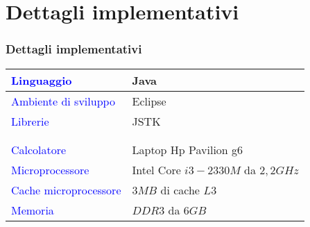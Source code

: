 \section{Dettagli implementativi}
\begin{frame}
  \frametitle{Dettagli implementativi}
\begin{center}
  \begin{tabular}{l l}
      \textcolor{blue}{Linguaggio}
    &
      Java
    \\\hline
      \textcolor{blue}{Ambiente di sviluppo}
    &
      Eclipse
    \\\hline
      \textcolor{blue}{Librerie}
    &
      JSTK
    \\\\\\

	\textcolor{blue}{Calcolatore}
      &
	Laptop Hp Pavilion g6
      \\\hline
	\textcolor{blue}{Microprocessore}
      &
	Intel Core $i3-2330M$ da $2,2GHz$
      \\\hline
	\textcolor{blue}{Cache microprocessore}
      &
	$3 MB$ di cache $L3$
      \\\hline
	\textcolor{blue}{Memoria}
      &
	$DDR3$ da $6 GB$
  \end{tabular}
\end{center}

    

\end{frame}
